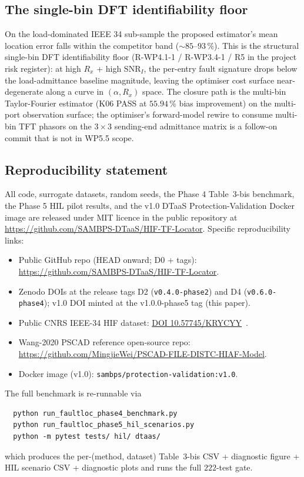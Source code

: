 \documentclass[journal]{IEEEtran}
\begin{document}
\subsection{The single-bin DFT identifiability floor}
On the load-dominated IEEE 34 sub-sample the proposed estimator's
mean location error falls within the competitor band ($\sim
85$--$93\,\%$).  This is the structural single-bin DFT
identifiability floor (R-WP4.1-1 / R-WP3.4-1 / R5 in the project
risk register): at high $R_x$ + high $\mathrm{SNR}_I$, the
per-entry fault signature drops below the load-admittance
baseline magnitude, leaving the optimiser cost surface near-
degenerate along a curve in $(\alpha, R_x)$ space.  The closure
path is the multi-bin Taylor-Fourier estimator
(K06 PASS at $55.94\,\%$ bias improvement) on the multi-port
observation surface; the optimiser's forward-model rewire to
consume multi-bin TFT phasors on the $3 \times 3$ sending-end
admittance matrix is a follow-on commit that is not in WP5.5
scope.

\subsection{Reproducibility statement}

All code, surrogate datasets, random seeds, the Phase 4
Table~3-bis benchmark, the Phase 5 HIL pilot results, and the
v1.0 DTaaS Protection-Validation Docker image are released
under MIT licence in the public repository at
\url{https://github.com/SAMBPS-DTaaS/HIF-TF-Locator}.  Specific
reproducibility links:

\begin{itemize}
\item Public GitHub repo (HEAD onward; D0 + tags):
      \url{https://github.com/SAMBPS-DTaaS/HIF-TF-Locator}.
\item Zenodo DOIs at the release tags D2 (\texttt{v0.4.0-phase2})
      and D4 (\texttt{v0.6.0-phase4}); v1.0 DOI minted at the
      v1.0.0-phase5 tag (this paper).
\item Public CNRS IEEE-34 HIF dataset:
      \href{https://doi.org/10.57745/KRYCYY}{DOI 10.57745/KRYCYY}~\cite{CNRS_2024_IEEE34}.
\item Wang-2020 PSCAD reference open-source repo:
      \url{https://github.com/MingjieWei/PSCAD-FILE-DISTC-HIAF-Model}.
\item Docker image (v1.0): \texttt{sambps/protection-validation:v1.0}.
\end{itemize}

The full benchmark is re-runnable via
\begin{verbatim}
  python run_faultloc_phase4_benchmark.py
  python run_faultloc_phase5_hil_scenarios.py
  python -m pytest tests/ hil/ dtaas/
\end{verbatim}
which produces the per-(method, dataset) Table~3-bis CSV +
diagnostic figure + HIL scenario CSV + diagnostic plots and
runs the full $222$-test gate.
\end{document}
